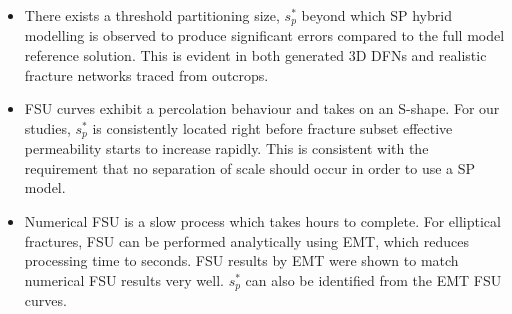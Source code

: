 \documentclass[a4paper]{article}
\begin{document}
\begin{itemize}
    \item There exists a threshold partitioning size, $s_p^*$ beyond which SP hybrid modelling is observed to produce significant errors compared to the full model reference solution. This is evident in both generated 3D DFNs and realistic fracture networks traced from outcrops.
    
    \item FSU curves exhibit a percolation behaviour and takes on an S-shape. For our studies, $s_p^*$ is consistently located right before fracture subset effective permeability starts to increase rapidly. This is consistent with the requirement that no separation of scale should occur in order to use a SP model.
    
    \item Numerical FSU is a slow process which takes hours to complete. For elliptical fractures, FSU can be performed analytically using EMT, which reduces processing time to seconds. FSU results by EMT were shown to match numerical FSU results very well. $s_p^*$ can also be identified from the EMT FSU curves. 
    
\end{itemize}



\end{document}
